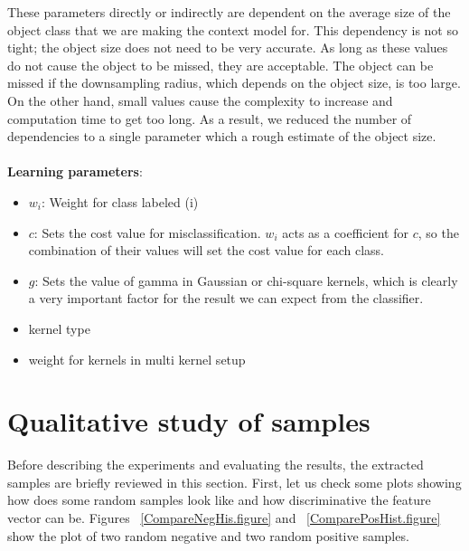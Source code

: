 These parameters directly or indirectly are dependent on the average size of the object class that we are making the context model
for. 
This dependency is not so tight; the object size does not need to be very accurate. 
As long as these values do not cause the object to be missed, they are acceptable.
The object can be missed if the downsampling radius, which depends on the object size, is too large. 
On the other hand, small values cause the complexity to increase and computation time to get too long.  
As a result, we reduced the number of dependencies to a single parameter which a rough estimate of the object size.\\
\\
{\bf Learning parameters}:
\begin{itemize}
 \item $w_i$: Weight for class labeled (i)
 \item $c$: Sets the cost value for misclassification.
 $w_i$ acts as a coefficient for $c$, so the combination of their values will set the cost value for each class.
 \item $g$: Sets the value of gamma in Gaussian or chi-square kernels, which is clearly a very important factor for the result we can 
expect from the classifier. 
 \item kernel type
 \item weight for kernels in multi kernel setup
\end{itemize}


\section{Qualitative study of samples}
\label{QStudy.ssec}

Before describing the experiments and evaluating the results, the extracted samples are briefly reviewed in this section. First, let us check some plots showing how does some random samples look like and how discriminative the feature vector  
can be.
Figures ~\ref{CompareNegHis.figure} and ~\ref{ComparePosHist.figure} show the plot of two random negative and two random 
positive samples.   

